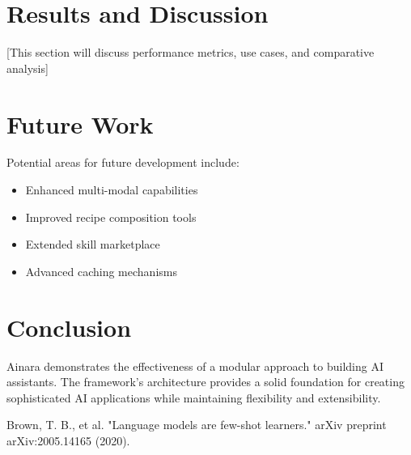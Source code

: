 \documentclass[conference]{IEEEtran}
\begin{document}
\section{Results and Discussion}
[This section will discuss performance metrics, use cases, and comparative analysis]

\section{Future Work}
Potential areas for future development include:
\begin{itemize}
    \item Enhanced multi-modal capabilities
    \item Improved recipe composition tools
    \item Extended skill marketplace
    \item Advanced caching mechanisms
\end{itemize}

\section{Conclusion}
Ainara demonstrates the effectiveness of a modular approach to building AI assistants. The framework's architecture provides a solid foundation for creating sophisticated AI applications while maintaining flexibility and extensibility.


\begin{thebibliography}{1}
 Brown, T. B., et al. "Language models are few-shot learners." arXiv preprint arXiv:2005.14165 (2020).
\end{thebibliography}
\end{document}
